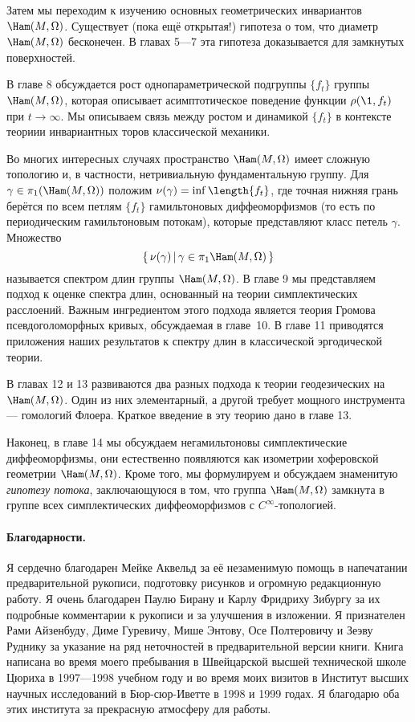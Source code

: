 Затем мы переходим к изучению основных геометрических инвариантов $\Ham(M,\Omega)$.
Существует (пока ещё открытая!) гипотеза о том, что диаметр $\Ham(M,\Omega)$ бесконечен.
В главах 5—7 эта гипотеза доказывается для замкнутых поверхностей.

В главе 8 обсуждается рост однопараметрической подгруппы $\{f_t\}$ группы $\Ham(M,\Omega)$, которая описывает асимптотическое поведение функции $\rho (\1, f_t)$ при $t \to \infty$.
Мы описываем связь между ростом и динамикой $\{f_t\}$ в контексте
теориии инвариантных торов классической механики.

Во многих интересных случаях пространство $\Ham(M,\Omega)$ имеет сложную топологию и, в частности, нетривиальную фундаментальную группу.
Для $\gamma\in\pi_1(\Ham(M,\Omega))$ положим $\nu(\gamma) \z= \inf \length \{f_t\}$, где
точная нижняя грань берётся по всем петлям $\{f_t\}$ гамильтоновых
диффеоморфизмов (то есть по периодическим гамильтоновым потокам),
которые представляют класс петель $\gamma$.
Множество
\[\set{\nu(\gamma)}{\gamma\in\pi_{1}\Ham(M,\Omega)}\]
называется спектром длин группы $\Ham(M,\Omega)$.
В главе 9 мы представляем подход к оценке спектра длин, основанный на
теории симплектических расслоений. 
Важным ингредиентом этого подхода является теория Громова
псевдоголоморфных кривых, обсуждаемая в главе~10. 
В главе 11 приводятся приложения наших результатов к спектру длин в
классической эргодической теории.

В главах 12 и 13 развиваются два разных подхода к теории геодезических на $\Ham(M,\Omega)$.
Один из них элементарный, а другой требует мощного инструмента — гомологий Флоера.
Краткое введение в эту теорию дано в главе 13.

Наконец, в главе 14 мы обсуждаем негамильтоновы симплектические
диффеоморфизмы, они естественно появляются как изометрии хоферовской
геометрии $\Ham(M,\Omega)$. 
Кроме того, мы формулируем и обсуждаем знаменитую \emph{гипотезу потока},
заключающуюся в том, что группа $\Ham(M,\Omega)$ замкнута в группе
всех симплектических диффеоморфизмов с $C^\infty$-топологией.  


\paragraph*{Благодарности.}
Я сердечно благодарен Мейке Аквельд %
за её незаменимую помощь в напечатании предварительной рукописи,
подготовку рисунков и огромную редакционную работу.
Я очень благодарен Паулю Бирану и Карлу Фридриху Зибургу за их подробные комментарии к рукописи и за улучшения в изложении.
Я признателен 
Рами Айзенбуду,
Диме Гуревичу, 
Мише Энтову, 
Осе Полтеровичу
и Зеэву Руднику за указание на ряд неточностей в предварительной версии книги.
Книга написана во время моего пребывания в Швейцарской высшей технической школе Цюриха в 1997—1998 учебном году и во время моих визитов в Институт высших научных исследований в Бюр-сюр-Иветте в 1998 и 1999 годах.
Я благодарю оба этих института за прекрасную атмосферу для работы. 
